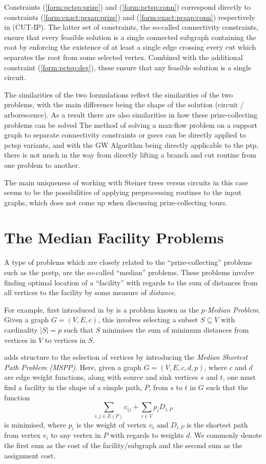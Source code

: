  Constraints (\ref{form:pctsp:prize}) and (\ref{form:pctsp:conn}) correspond directly to constraints
 (\ref{form:exact:pcsap:prize}) and (\ref{form:exact:pcsap:conn}) respectively in (CUT-IP).
 The latter set of constraints, the so-called connectivity constraints, ensure that every feasible solution
 is a single connected subgraph containing the root by enforcing the existence of at least a single edge crossing
 every cut which separates the root from some selected vertex. Combined with the
 additional constraint (\ref{form:pctsp:deg}), these ensure that any feasible solution is a single circuit.

 The similarities of the two formulations reflect the similarities of the two problems, with the main difference being
 the shape of the solution (circuit / arborescence).
 As a result there are also similarities in how these prize-collecting problems can be solved
 The method of solving a max-flow problem on a support graph
 to separate connectivity constraints or \glspl{gsec} can
 be directly applied to \gls{pctsp} variants, and with the GW Algorithm being
 directly applicable to the \gls{ptp},
 there is not much in the way from directly lifting a branch and cut routine from
 one problem to another.

 The main uniqueness of working with Steiner trees versus
 circuits in this case seems to be the possibilities of applying
 preprocessing routines to the input graphs, which does not come up
 when discussing prize-collecting tours.

 \section{The Median Facility Problems}
 \label{sec:related:median}
 A type of problems which are closely related to the
 ``prize-collecting'' problems such as the \gls{pcstp}, are the so-called
 ``median'' problems.
 These problems involve finding optimal location of a ``facility''
 with regards to the sum
 of distances from all vertices to the facility by some measure of
 \textit{distance}.

 For example, first introduced in \citeyear{hakimi1964optimum}
 by \citet{hakimi1964optimum} is a problem known as
 the \textit{$p$-Median Problem}.
 Given a graph $G = (V, E, c)$, this involves selecting a subset $S \subseteq V$ with
 cardinality $|S| = p$ such that $S$ minimises the sum of minimum distances
 from vertices in $V$ to vertices in $S$.
 
 \citet{current1987median} adds structure to the selection of vertices by introducing the \textit{Median Shortest Path Problem (MSPP)}.
 Here, given a graph $G = (V,E,c,d,p)$,
 where $c$ and $d$ are edge weight functions,
 along with source and sink vertices $s$ and $t$,
 one must find a facility
 in the shape of a simple path, $P$,
 from $s$ to $t$ in $G$
 such that the function
 $$\sum_{i,j \in E(P)} c_{ij} + \sum_{i \in V} p_i D_{i, P}$$
 is minimised,
 where $p_i$ is the weight of vertex $v_i$ and
 $D_{i, P}$ is the shortest path from vertex $v_i$ to any vertex in $P$ with regards to
 weights $d$.
 We commonly denote the first sum as the cost of the facility/subgraph and the second sum as the assignment cost.


